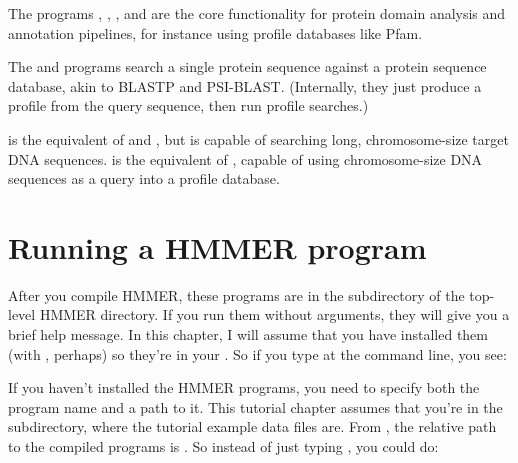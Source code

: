 The programs , , , and
 are the core functionality for protein domain analysis
and annotation pipelines, for instance using profile databases like
Pfam.

The  and  programs search a single
protein sequence against a protein sequence database, akin to BLASTP
and PSI-BLAST.  (Internally, they just produce a profile from the
query sequence, then run profile searches.)

 is the equivalent of  and ,
but is capable of searching long, chromosome-size target DNA
sequences.   is the equivalent of ,
capable of using chromosome-size DNA sequences as a query into a
profile database.




\section{Running a HMMER program}
\label{section:running}

After you compile HMMER, these programs are in the 
subdirectory of the top-level HMMER directory. If you run them without
arguments, they will give you a brief help message.  In this
chapter, I will assume that you have installed them (with , perhaps) so they're in your . So if you type
 at the command line, you see:

  \vspace{1ex}
  \vspace{-1ex}
  \vspace{-1ex}

If you haven't installed the HMMER programs, you need to specify both
the program name and a path to it. This tutorial chapter assumes
that you're in the  subdirectory, where the tutorial
example data files are. From , the relative
path to the compiled programs is . So instead of just
typing , you could do: 

  \vspace{1ex}
  \vspace{1ex}

